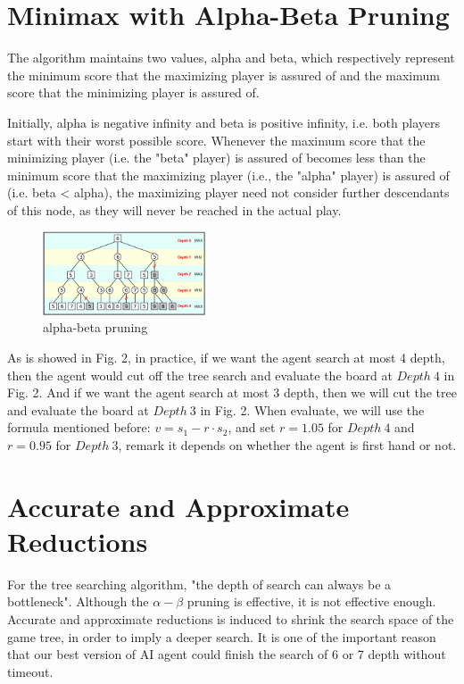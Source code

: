 \documentclass[final]{cvpr}
\begin{document}
\section{Minimax with Alpha-Beta Pruning}
\label{sec:Minimax}
The algorithm maintains two values, alpha and beta, which respectively represent the minimum score that the maximizing player is assured of and the maximum score that the minimizing player is assured of. 

Initially, alpha is negative infinity and beta is positive infinity, 
i.e. both players start with their worst possible score.
Whenever the maximum score that the minimizing player (i.e. the "beta" player) 
is assured of becomes less than the minimum score that the maximizing player 
(i.e., the "alpha" player) is assured of (i.e. beta < alpha), the maximizing player need not consider further descendants of this node, as they will never be reached in the actual play.

\begin{figure}[h]
\centering 
\includegraphics[width=0.43\textwidth]{figures/pic7.png} 
\caption{alpha-beta pruning} 
\label{Fig.main1} %
\end{figure}

\par As is showed in Fig. 2, in practice, if we want the agent search at most 4 depth, then the agent would cut off the tree search and evaluate the board at $Depth\ 4$ in Fig. 2. And if we want the agent search at most 3 depth, then we will cut the tree and evaluate the board at $Depth\ 3$ in Fig. 2. When evaluate, we will use the formula mentioned before: $v = s_1 - r\cdot s_2$, and set $r = 1.05$ for $Depth\ 4$ and $r = 0.95$ for $Depth\ 3$, remark it depends on whether the agent is first hand or not.

\section{Accurate and Approximate Reductions}\label{sec:AD}
For the tree searching algorithm, "the 
depth of search can always be a bottleneck". \cite{adp/ztt}
%
Although the $\alpha-\beta$ pruning is effective, it is not effective enough.
%
Accurate and approximate reductions is induced to shrink the search space of the game tree,
in order to imply a deeper search.
%
It is one of the important reason that our best version of AI agent could finish the search of 6 or 7 depth without timeout.
%
\end{document}
